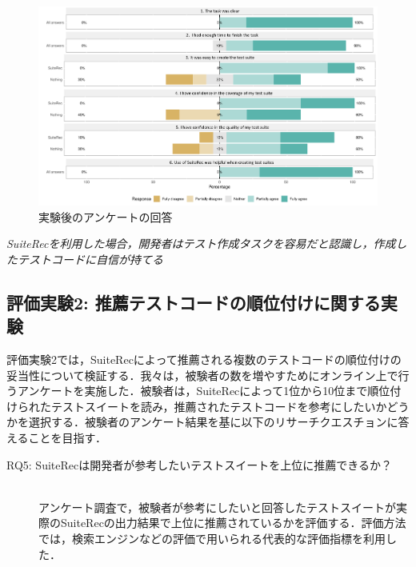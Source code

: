 \documentclass[12pt]{jarticle} %
\begin{document}
\begin{figure}[htbp]
  \begin{center}
   \includegraphics[width=15cm]{suiterec-expt.pdf}
  \caption{実験後のアンケートの回答}
  \label{QA}
  \end{center}
\end{figure}

\begin{breakbox}
\textit{{\sf SuiteRec}を利用した場合，開発者はテスト作成タスクを容易だと認識し，作成したテストコードに自信が持てる}
\end{breakbox}

\subsection{評価実験2: 推薦テストコードの順位付けに関する実験}
評価実験2では，{\sf SuiteRec}によって推薦される複数のテストコードの順位付けの妥当性について検証する．我々は，被験者の数を増やすためにオンライン上で行うアンケートを実施した．被験者は，{\sf SuiteRec}によって1位から10位まで順位付けられたテストスイートを読み，推薦されたテストコードを参考にしたいかどうかを選択する．被験者のアンケート結果を基に以下のリサーチクエスチョンに答えることを目指す．

\begin{description}
\item[RQ5: SuiteRecは開発者が参考したいテストスイートを上位に推薦できるか？]~\\

アンケート調査で，被験者が参考にしたいと回答したテストスイートが実際の{\sf SuiteRec}の出力結果で上位に推薦されているかを評価する．評価方法では，検索エンジンなどの評価で用いられる代表的な評価指標を利用した．
\end{description}
\end{document}
